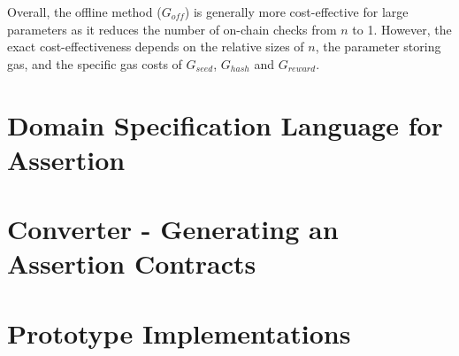 \documentclass[runningheads]{llncs}
\begin{document}
      
Overall, the offline method (\( G_{off} \)) is generally more cost-effective for large parameters as it reduces the number of on-chain checks from \( n \) to 1. However, the exact cost-effectiveness depends on the relative sizes of \( n \), the parameter storing gas, and the specific gas costs of \( G_{seed} \), \( G_{hash} \) and \( G_{reward} \).
\section{Domain Specification Language for Assertion}
\section{Converter - Generating an Assertion Contracts} 
\section{Prototype Implementations}
\end{document}
